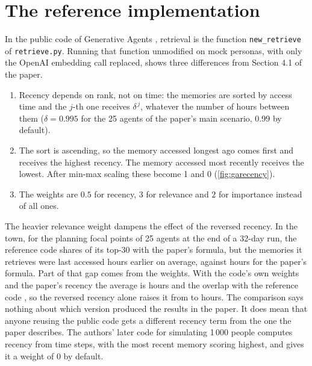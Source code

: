\documentclass[11pt,a4paper]{article}
\newcommand{\code}[1]{\texttt{#1}}
\begin{document}
\begin{table}[t]
\centering\small

\caption{Recall@10 on 100\,000 GloVe memories as the relevance weight grows (recency and importance weights fixed at 1, min-max normalised).}
\label{tab:relsweep}
\end{table}

\section{The reference implementation}
\label{sec:reference}

In the public code of Generative Agents \citep{ga_code}, retrieval is the function \code{new\_retrieve} of \code{retrieve.py}. Running that function unmodified on mock personas, with only the OpenAI embedding call replaced, shows three differences from Section 4.1 of the paper.
\begin{enumerate}
\item Recency depends on rank, not on time: the memories are sorted by access time and the $j$-th one receives $\delta^{\,j}$, whatever the number of hours between them ($\delta=0.995$ for the 25 agents of the paper's main scenario, 0.99 by default).
\item The sort is ascending, so the memory accessed longest ago comes first and receives the highest recency. The memory accessed most recently receives the lowest. After min-max scaling these become 1 and 0 (\cref{fig:garecency}).
\item The weights are $0.5$ for recency, $3$ for relevance and $2$ for importance instead of all ones.
\end{enumerate}
The heavier relevance weight dampens the effect of the reversed recency. In the town, for the planning focal points of 25 agents at the end of a 32-day run, the reference code shares \GaOverlap{} of its top-30 with the paper's formula, but the memories it retrieves were last accessed \GaAgeRef{} hours earlier on average, against \GaAgePaper{} hours for the paper's formula. Part of that gap comes from the weights. With the code's own weights and the paper's recency the average is \GaAgeCodeW{} hours and the overlap with the reference code \GaOverlapCodeW{}, so the reversed recency alone raises it from \GaAgeCodeW{} to \GaAgeRef{} hours. The comparison says nothing about which version produced the results in the paper. It does mean that anyone reusing the public code gets a different recency term from the one the paper describes. The authors' later code for simulating 1\,000 people \citep{genagents_code} computes recency from time steps, with the most recent memory scoring highest, and gives it a weight of 0 by default.
\end{document}
